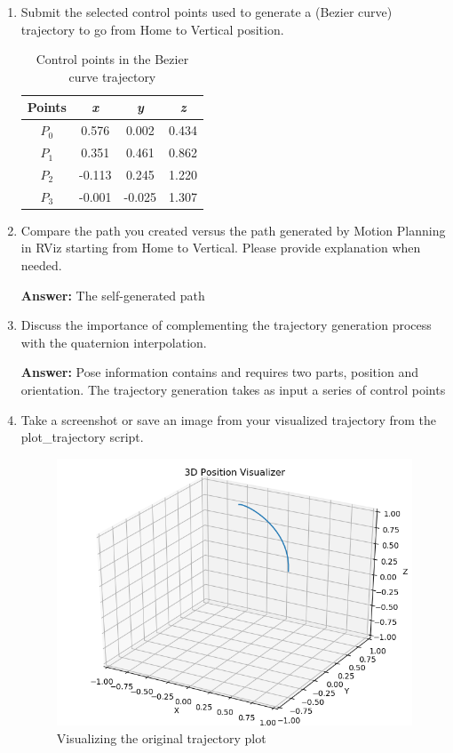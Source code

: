 \documentclass[12pt]{article}
\begin{document}
\begin{enumerate}

    \item Submit the selected control points used to generate a (Bezier curve) trajectory to go from Home to Vertical position.
    
    \begin{table}[H]
        \centering
        \begin{tabular}{cccc}
            \toprule
            Points & \textit{x} & \textit{y} & \textit{z} \\ \midrule
            $P_0$ & 0.576 & 0.002 & 0.434 \\
            $P_1$ & 0.351 & 0.461 & 0.862 \\
            $P_2$ & -0.113 & 0.245 & 1.220 \\
            $P_3$ & -0.001 & -0.025 & 1.307 \\ \bottomrule
        \end{tabular}
        \caption{Control points in the Bezier curve trajectory}
    \end{table}
    
    \item Compare the path you created versus the path generated by Motion Planning in RViz starting from Home to Vertical. Please provide explanation when needed.
    
    \textbf{Answer: }The self-generated path 
    
    \item Discuss the importance of complementing the trajectory generation process with the quaternion interpolation.
    
    \textbf{Answer: }Pose information contains and requires two parts, position and orientation. The trajectory generation takes as input a series of control points 
    
    \item Take a screenshot or save an image from your visualized trajectory from the plot\_trajectory script.
    
    \begin{figure}[H]
        \vspace{-10pt}
        \centering\includegraphics[width=12cm]{images/plot_traj.png}
        \caption{Visualizing the original trajectory plot}\label{fig:plot_traj}
    \end{figure}
    

\end{enumerate}
\end{document}
